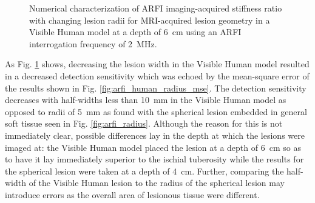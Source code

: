 			\begin{figure}[!htb]
				\centering
				\caption[Numerical characterization of ARFI imaging-acquired stiffness ratio with changing lesion radii in a visible human model]{Numerical characterization of ARFI imaging-acquired stiffness ratio with changing lesion radii for MRI-acquired lesion geometry in a Visible Human model at a depth of \SI{6}{\cm} using an ARFI interrogation frequency of \SI{2}{\MHz}.}
				\label{fig:arfi_human_radius}
			\end{figure}

			As Fig. \ref{fig:arfi_human_radius} shows, decreasing the lesion width in the Visible Human model resulted in a decreased detection sensitivity which was echoed by the mean-square error of the results shown in Fig. \ref{fig:arfi_human_radius_mse}. The detection sensitivity decreases with half-widths less than \SI{10}{\mm} in the Visible Human model as opposed to radii of \SI{5}{\mm} as found with the spherical lesion embedded in general soft tissue seen in Fig. \ref{fig:arfi_radius}. Although the reason for this is not immediately clear, possible differences lay in the depth at which the lesions were imaged at: the Visible Human model placed the lesion at a depth of \SI{6}{\cm} so as to have it lay immediately superior to the ischial tuberosity while the results for the spherical lesion were taken at a depth of \SI{4}{\cm}. Further, comparing the half-width of the Visible Human lesion to the radius of the spherical lesion may introduce errors as the overall area of lesionous tissue were different.

